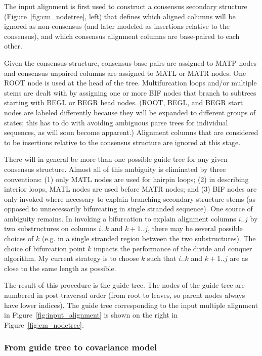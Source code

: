 \documentclass[11pt]{article}
\begin{document}
The input alignment is first used to construct a consensus secondary
structure (Figure~\ref{fig:cm_nodetree}, left) that defines which
aligned columns will be ignored as non-consensus (and later modeled as
insertions relative to the consensus), and which consensus alignment
columns are base-paired to each other.

Given the consensus structure, consensus base pairs are assigned to
MATP nodes and consensus unpaired columns are assigned to MATL or MATR
nodes. One ROOT node is used at the head of the tree.  Multifurcation
loops and/or multiple stems are dealt with by assigning one or more
BIF nodes that branch to subtrees starting with BEGL or BEGR head
nodes. (ROOT, BEGL, and BEGR start nodes are labeled differently
because they will be expanded to different groups of states; this has
to do with avoiding ambiguous parse trees for individual sequences, as
will soon become apparent.) Alignment columns that are considered to
be insertions relative to the consensus structure are ignored at this
stage.

There will in general be more than one possible guide tree for any
given consensus structure. Almost all of this ambiguity is eliminated
by three conventions: (1) only MATL nodes are used for hairpin loops;
(2) in describing interior loops, MATL nodes are used before MATR
nodes; and (3) BIF nodes are only invoked where necessary to explain
branching secondary structure stems (as opposed to unnecessarily
bifurcating in single stranded sequence). One source of ambiguity
remains. In invoking a bifurcation to explain alignment columns $i..j$
by two substructures on columns $i..k$ and $k+1..j$, there may be
several possible choices of $k$ (e.g. in a single stranded region
between the two substructures). The choice of bifurcation point $k$
impacts the performance of the divide and conquer algorithm.  My
current strategy is to choose $k$ such that $i..k$ and $k+1..j$ are as
close to the same length as possible.

The result of this procedure is the guide tree. The nodes of the guide
tree are numbered in post-traversal order (from root to leaves, so
parent nodes always have lower indices). The guide tree corresponding
to the input multiple alignment in Figure~\ref{fig:input_alignment} is
shown on the right in Figure~\ref{fig:cm_nodetree}.

\subsubsection{From guide tree to covariance model}
\end{document}
